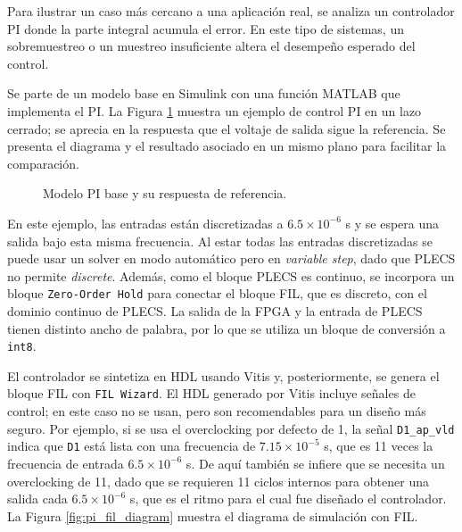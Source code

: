 Para ilustrar un caso más cercano a una aplicación real, se analiza un controlador PI donde la parte integral acumula el error. En este tipo de sistemas, un sobremuestreo o un muestreo insuficiente altera el desempeño esperado del control.

Se parte de un modelo base en Simulink con una función MATLAB que implementa el PI. La Figura \ref{fig:pi_model_base} muestra un ejemplo de control PI en un lazo cerrado; se aprecia en la respuesta que el voltaje de salida sigue la referencia. Se presenta el diagrama y el resultado asociado en un mismo plano para facilitar la comparación.

\begin{figure}[H]
  \centering
  \begin{minipage}[t]{0.48\textwidth}
    \centering
    \caption*{Diagrama base del PI}
  \end{minipage}
  \begin{minipage}[t]{0.48\textwidth}
    \centering
    \caption*{Respuesta del PI base}
  \end{minipage}
  \caption{Modelo PI base y su respuesta de referencia.}
  \label{fig:pi_model_base}
\end{figure}

En este ejemplo, las entradas están discretizadas a $6.5\times 10^{-6}$ s y se espera una salida bajo esta misma frecuencia. Al estar todas las entradas discretizadas se puede usar un solver en modo automático pero en \textit{variable step}, dado que PLECS no permite \textit{discrete}. Además, como el bloque PLECS es continuo, se incorpora un bloque \texttt{Zero-Order Hold} para conectar el bloque FIL, que es discreto, con el dominio continuo de PLECS. La salida de la FPGA y la entrada de PLECS tienen distinto ancho de palabra, por lo que se utiliza un bloque de conversión a \texttt{int8}.

El controlador se sintetiza en HDL usando Vitis y, posteriormente, se genera el bloque FIL con \texttt{FIL Wizard}. El HDL generado por Vitis incluye señales de control; en este caso no se usan, pero son recomendables para un diseño más seguro. Por ejemplo, si se usa el overclocking por defecto de 1, la señal \texttt{D1\_ap\_vld} indica que \texttt{D1} está lista con una frecuencia de $7.15\times 10^{-5}$ s, que es 11 veces la frecuencia de entrada $6.5\times 10^{-6}$ s. De aquí también se infiere que se necesita un overclocking de 11, dado que se requieren 11 ciclos internos para obtener una salida cada $6.5\times 10^{-6}$ s, que es el ritmo para el cual fue diseñado el controlador. La Figura \ref{fig:pi_fil_diagram} muestra el diagrama de simulación con FIL.

